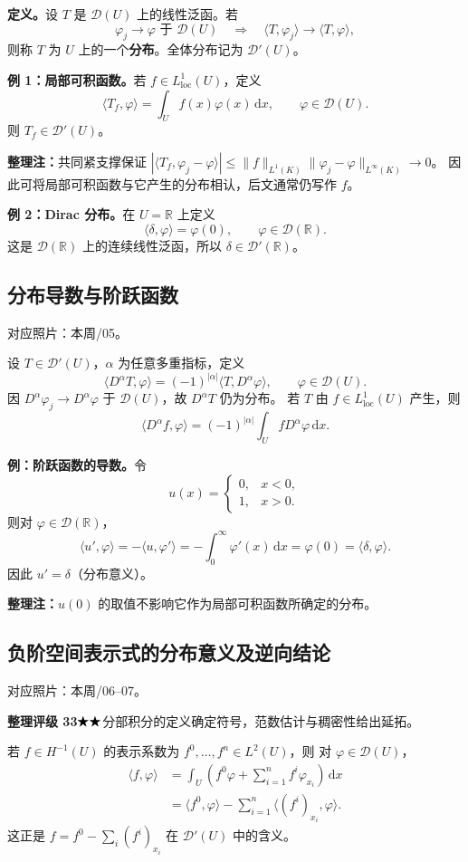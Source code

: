 \documentclass[UTF8,a4paper,11pt,fontset=fandol]{ctexart}
\newcommand{\R}{\mathbb R}
\newcommand{\dd}{\,\mathrm d}
\newcommand{\ednote}[1]{\par{\small\color{notegray}\textbf{整理注：}#1}\par}
\newcommand{\source}[1]{{\small\color{notegray}对应照片：#1。}\par}
\newcommand{\proofstars}[1]{\ensuremath{%
\ifnum#1>0\relax\bigstar\fi
\ifnum#1>1\relax\bigstar\fi
\ifnum#1>2\relax\bigstar\fi
\ifnum#1>3\relax\bigstar\fi
\ifnum#1>4\relax\bigstar\fi}}
\newcommand{\proofrating}[3]{\par{\small\color{proofblue}%
\textbf{整理评级 #1}\enspace\proofstars{#2}\quad #3\par}}
\begin{document}
\textbf{定义。}设 $T$ 是 $\mathcal D(U)$ 上的线性泛函。若
\[
\varphi_j\longrightarrow\varphi\text{ 于 }\mathcal D(U)
\quad\Longrightarrow\quad
\langle T,\varphi_j\rangle\longrightarrow\langle T,\varphi\rangle,
\]
则称 $T$ 为 $U$ 上的一个\textbf{分布}。全体分布记为 $\mathcal D'(U)$。

\textbf{例 1：局部可积函数。}若 $f\in L^1_{\mathrm{loc}}(U)$，定义
\[
\langle T_f,\varphi\rangle=\int_Uf(x)\varphi(x)\dd x,
\qquad\varphi\in\mathcal D(U).
\]
则 $T_f\in\mathcal D'(U)$。
\ednote{共同紧支撑保证
$|\langle T_f,\varphi_j-\varphi\rangle|
\leq\|f\|_{L^1(K)}\|\varphi_j-\varphi\|_{L^\infty(K)}\to0$。
因此可将局部可积函数与它产生的分布相认，后文通常仍写作 $f$。}

\textbf{例 2：Dirac 分布。}在 $U=\R$ 上定义
\[
\boxed{\langle\delta,\varphi\rangle=\varphi(0),\qquad
\varphi\in\mathcal D(\R).}
\]
这是 $\mathcal D(\R)$ 上的连续线性泛函，所以 $\delta\in\mathcal D'(\R)$。

\newpage
\subsection{分布导数与阶跃函数}
\source{本周/05}
设 $T\in\mathcal D'(U)$，$\alpha$ 为任意多重指标，定义
\[
\boxed{\langle D^\alpha T,\varphi\rangle
=(-1)^{|\alpha|}\langle T,D^\alpha\varphi\rangle,
\qquad\varphi\in\mathcal D(U).}
\]
因 $D^\alpha\varphi_j\to D^\alpha\varphi$ 于 $\mathcal D(U)$，故
$D^\alpha T$ 仍为分布。
若 $T$ 由 $f\in L^1_{\mathrm{loc}}(U)$ 产生，则
\[
\langle D^\alpha f,\varphi\rangle
=(-1)^{|\alpha|}\int_UfD^\alpha\varphi\dd x.
\]

\textbf{例：阶跃函数的导数。}令
\[
u(x)=\begin{cases}0,&x<0,\\1,&x>0.\end{cases}
\]
则对 $\varphi\in\mathcal D(\R)$，
\[
\langle u',\varphi\rangle
=-\langle u,\varphi'\rangle
=-\int_0^\infty\varphi'(x)\dd x
=\varphi(0)=\langle\delta,\varphi\rangle.
\]
因此 $u'=\delta$（分布意义）。
\ednote{$u(0)$ 的取值不影响它作为局部可积函数所确定的分布。}

\subsection{负阶空间表示式的分布意义及逆向结论}
\source{本周/06--07}
\proofrating{33}{2}{分部积分的定义确定符号，范数估计与稠密性给出延拓。}
若 $f\in H^{-1}(U)$ 的表示系数为 $f^0,\ldots,f^n\in L^2(U)$，则
对 $\varphi\in\mathcal D(U)$，
\[
\begin{aligned}
\langle f,\varphi\rangle
&=\int_U\left(f^0\varphi+\sum_{i=1}^nf^i\varphi_{x_i}\right)\dd x\\
&=\langle f^0,\varphi\rangle
  -\sum_{i=1}^n\langle(f^i)_{x_i},\varphi\rangle.
\end{aligned}
\]
这正是 $f=f^0-\sum_i(f^i)_{x_i}$ 在 $\mathcal D'(U)$ 中的含义。
\end{document}

